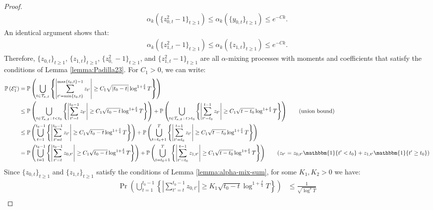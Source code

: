 \begin{proof}
\begin{align*}
    \alpha_k(\{z^2_{0,t} - 1\}_{t\geq 1}) \leq \alpha_k(\{y_{0,t}\}_{t\geq 1}) \leq e^{-Ck}.
\end{align*}
An identical argument shows that:
\begin{align*}
    \alpha_k(\{z^2_{1,t} - 1\}_{t\geq 1}) \leq \alpha_k(\{z_{1,t}\}_{t\geq 1}) \leq e^{-Ck}.
\end{align*}
Therefore, $\{z_{0,t}\}_{t\geq1}$, $\{z_{1,t}\}_{t\geq1}$, $\{z^2_{0,}-1\}_{t\geq1}$, and $\{z^2_{1,t}-1\}_{t\geq1}$ are all $\alpha$-mixing processes with moments and coefficients that satisfy the conditions of Lemma \ref{lemma:Padilla23}. For $C_1 >0$, we can write:
\small
\begin{align*}
    \Pr\left(\mathcal{E}_1^c\right) &= \Pr\left(\bigcup_{t \in \mathcal{T}_{\kappa, \delta}} \left\{\left|\sum_{t'=\min\{t_0,t\}}^{\max\{t_0,t\}-1} z_{t'}\right| \geq C_1\sqrt{|t_0-t|}\log^{1+\frac{\delta}{4}} T\right\} \right) \\
    &\leq \Pr\left(\bigcup_{t \in \mathcal{T}_{\kappa, \delta} \::\: t < t_0} \left\{\left|\sum_{t'=t}^{t_0-1} z_{t'}\right| \geq C_1\sqrt{t_0-t}\log^{1+\frac{\delta}{4}} T\right\} \right) + \Pr\left(\bigcup_{t \in \mathcal{T}_{\kappa, \delta} \::\: t > t_0} \left\{\left|\sum_{t'=t_0}^{t-1} z_{t'}\right| \geq C_1\sqrt{t-t_0}\log^{1+\frac{\delta}{4}} T\right\} \right) \tag{union bound} \\
    &\leq \Pr\left(\bigcup_{t = 1}^{t_0-1} \left\{\left|\sum_{t'=t}^{t_0-1} z_{t'}\right| \geq C_1\sqrt{t_0-t}\log^{1+\frac{\delta}{4}} T\right\} \right) + \Pr\left(\bigcup_{t = t_0+1}^T \left\{\left|\sum_{t'=t_0}^{t-1} z_{t'}\right| \geq C_1\sqrt{t-t_0}\log^{1+\frac{\delta}{4}} T\right\} \right) \\
    &= \Pr\left(\bigcup_{t = 1}^{t_0-1} \left\{\left|\sum_{t'=t}^{t_0-1} z_{0,t'}\right| \geq C_1\sqrt{t_0-t}\log^{1+\frac{\delta}{4}} T\right\} \right) + \Pr\left(\bigcup_{t = t_0+1}^T \left\{\left|\sum_{t'=t_0}^{t-1} z_{1,t'}\right| \geq C_1\sqrt{t-t_0}\log^{1+\frac{\delta}{4}} T\right\} \right) \tag{$z_{t'} = z_{0,t'} \mathbbm{1}\{t' < t_0\}  + z_{1,t'}\mathbbm{1}\{t' \geq t_0\}$}
\end{align*}
\normalsize
Since $\{z_{0,t}\}_{t\geq1}$ and $\{z_{1,t}\}_{t\geq1}$ satisfy the conditions of Lemma \ref{lemma:alpha-mix-sum}, for some $K_1,K_2 > 0$ we have:
\begin{align*}
    \Pr\left(\bigcup_{t = 1}^{t_0-1} \left\{\left|\sum_{t'=t}^{t_0-1} z_{0,t'}\right| \geq K_1\sqrt{t_0-t}\log^{1+\frac{\delta}{4}} T\right\} \right) &\leq \frac{1}{\sqrt{\log^\delta T}} \\

\end{align*}
\end{proof}
